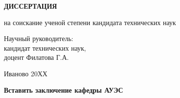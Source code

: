 \begin{titlepage}
\begin{center}
{\bfseries ДИССЕРТАЦИЯ}\par
на соискание ученой степени кандидата технических наук\par
\end{center}

\vspace{1.5cm}

\begin{flushright}
Научный руководитель:\\
кандидат технических наук,\\
доцент Филатова Г.А.
\end{flushright}

\vfill

\begin{center}
Иваново 20ХХ
\end{center}

\end{titlepage}

\setcounter{page}{2}
\begin{center}
\vspace*{5cm}
{\color{red}\textbf{Вставить заключение кафедры АУЭС}}
\end{center}
\clearpage
